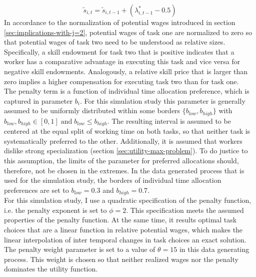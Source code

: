 \documentclass[../main.tex]{subfiles}
\begin{document}
\begin{equation} \label{eq:skill_accumulation}
\tilde{s}_{i,t} = \tilde{s}_{i, t-1} + (\lambda_{i, t-1}^* - 0.5)
\end{equation}
In accordance to the normalization of potential wages introduced in section \ref{sec:implications-with-j=2}, potential wages of task one are normalized to zero so that potential wages of task two need to be understood as relative sizes. Specifically, a skill endowment for task two that is positive indicates that a worker has a comparative advantage in executing this task and vice versa for negative skill endowments. Analogously, a relative skill price that is larger than zero implies a higher compensation for executing task two than for task one.
\\
The penalty term is a function of individual time allocation preference, which is captured in parameter $b_i$. For this simulation study this parameter is generally assumed to be uniformly distributed within some borders $\{b_{low}, b_{high}\}$ with $b_{low}, b_{high} \in [0, 1] \; \text{and} \; b_{low} \leq b_{high}$. The resulting interval is assumed to be centered at the equal split of working time on both tasks, so that neither task is systematically preferred to the other. Additionally, it is assumed that workers dislike strong specialization (section \ref{sec:utility-max-problem}). To do justice to this assumption, the limits of the parameter for preferred allocations should, therefore, not be chosen in the extremes. In the data generated process that is used for the simulation study, the borders of individual time allocation preferences are set to $b_{low} = 0.3$ and $b_{high} = 0.7$.
\\
For this simulation study, I use a quadratic specification of the penalty function, i.e. the penalty exponent is set to $\phi = 2$. This specification meets  the assumed properties of the penalty function. 
At the same time, it results optimal task choices that are a linear function in relative potential wages, which makes the linear interpolation of inter temporal changes in task choices an exact solution. The penalty weight parameter is set to a value of $\theta = 15$ in this data generating process. This weight is chosen so that neither realized wages nor the penalty dominates the utility function.
\end{document}

